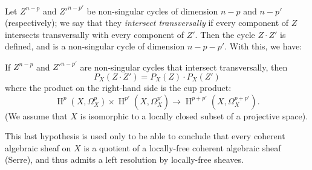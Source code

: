 \documentclass{article}
\theoremstyle{plain}
\newenvironment{theorem}[1]
  {\renewcommand\theinnertheorem{#1}\innertheorem}
  {\endinnertheorem}
\theoremstyle{definition}
\DeclareMathOperator{\HH}{H}
\newcommand{\oldpage}[1]{\marginpar{\footnotesize$\Big\vert$ \textit{p.~#1}}}
\begin{document}
Let $Z^{n-p}$ and $Z'^{n-p'}$ be non-singular cycles of dimension $n-p$ and $n-p'$ (respectively);
we say that they \emph{intersect transversally} if every component of $Z$ intersects transversally with every component of $Z'$.
Then the cycle $Z\cdot Z'$ is defined, and is a non-singular cycle of dimension $n-p-p'$.
With this, we have:

\oldpage{149-11}
\begin{theorem}{1}
\label{theorem1}
  If $Z^{n-p}$ and $Z'^{n-p'}$ are non-singular cycles that intersect transversally, then
  \[
  \label{4.4}
    P_X(Z\cdot Z') = P_X(Z)\cdot P_X(Z')
  \tag{4.4}
  \]
  where the product on the right-hand side is the cup product:
  \[
    \HH^p(X,\Omega_X^p)\times\HH^{p'}(X,\Omega_X^{p'}) \to \HH^{p+p'}(X,\Omega_X^{p+p'}).
  \]
  (We assume that $X$ is isomorphic to a locally closed subset of a projective space).
\end{theorem}

This last hypothesis is used only to be able to conclude that every coherent algebraic sheaf on $X$ is a quotient of a locally-free coherent algebraic sheaf (Serre), and thus admits a left resolution by locally-free sheaves.
\end{document}
